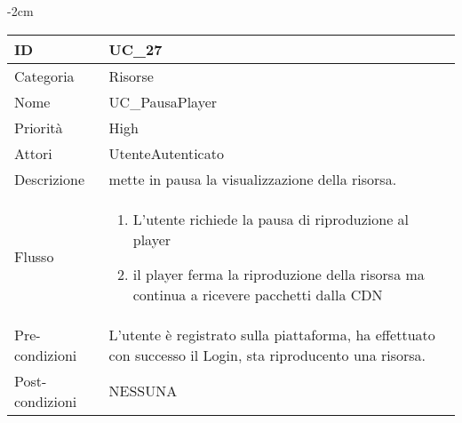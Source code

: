 \begin{center}
\begin{table}[bp]
    \centering
    \addtolength{\leftskip} {-2cm}
\begin{tabular}{ |p{2.6cm}|p{13cm}|  }
\hline
ID & UC\_27 \\\hline
Categoria & Risorse\\\hline
Nome & UC\_PausaPlayer\\\hline
Priorità & High \\\hline
Attori &  UtenteAutenticato \\\hline
Descrizione & mette in pausa la visualizzazione della risorsa.\\\hline
Flusso &  	\vspace{-5mm} \begin{enumerate}
			\item L'utente richiede la pausa di riproduzione al player
			\item il player ferma la riproduzione della risorsa ma continua a ricevere pacchetti dalla CDN 
			\end{enumerate}
			\\\hline
Pre-condizioni & L'utente è registrato sulla piattaforma, ha effettuato con successo il Login, sta riproducento una risorsa.\\\hline
Post-condizioni & NESSUNA\\\hline
\end{tabular}
\label{table_use_case:27}\newline
\end{table}


\end{center}
